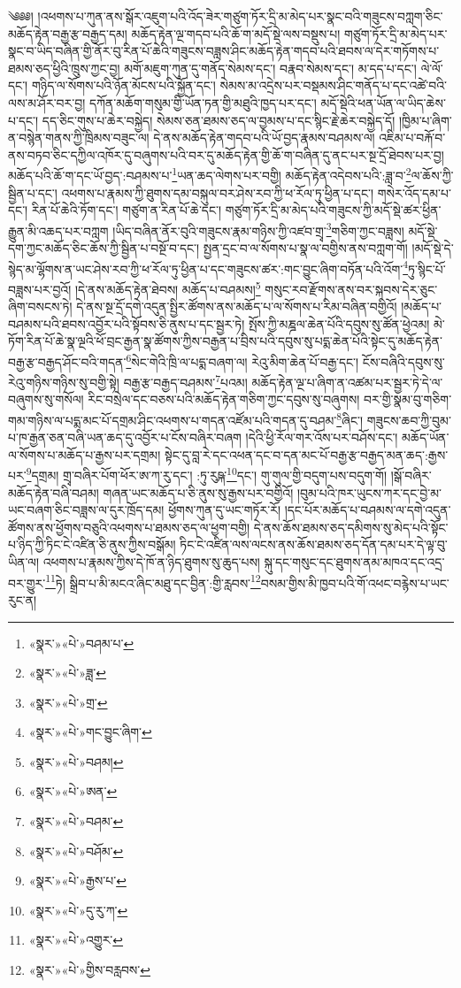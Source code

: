 ༄༅༅། །འཕགས་པ་ཀུན་ནས་སྒོར་འཇུག་པའི་འོད་ཟེར་གཙུག་ཏོར་དྲི་མ་མེད་པར་སྣང་བའི་གཟུངས་བཀླག་ཅིང་མཆོད་རྟེན་བརྒྱ་རྩ་བརྒྱད་དམ། མཆོད་རྟེན་ལྔ་གདབ་པའི་ཆོ་ག་མདོ་སྡེ་ལས་བསྡུས་པ། གཙུག་ཏོར་དྲི་མ་མེད་པར་སྣང་བ་ཡིད་བཞིན་གྱི་ནོར་བུ་རིན་པོ་ཆེའི་གཟུངས་བཟླས་ཤིང་མཆོད་རྟེན་གདབ་པའི་ཐབས་ལ་དེར་གཏོགས་པ་ཐམས་ཅད་ཕྱིའི་ཁྲུས་ཀྱང་བྱ། མགོ་མཇུག་ཀུན་དུ་གནོད་སེམས་དང་། བརྣབ་སེམས་དང་། མ་དད་པ་དང་། ལེ་ལོ་དང་། གཉིད་ལ་སོགས་པའི་ཉོན་མོངས་པའི་སྐྱོན་དང་། སེམས་མ་འདྲེས་པར་བསྡམས་ཤིང་གནོད་པ་དང་འཚེ་བའི་ལས་མ་ཤོར་བར་བྱ། དཀོན་མཆོག་གསུམ་གྱི་ཡོན་ཏན་གྱི་མཐུའི་ཁྱད་པར་དང་། མདོ་སྡེའི་ཕན་ཡོན་ལ་ཡིད་ཆེས་པ་དང་། དད་ཅིང་གུས་པ་ཆེར་བསྐྱེད། སེམས་ཅན་ཐམས་ཅད་ལ་བྱམས་པ་དང་སྙིང་རྗེ་ཆེར་བསྐྱེད་དོ། །ཁྱིམ་པ་ཞིག་ན་བསྙེན་གནས་ཀྱི་ཁྲིམས་བཟུང་ལ། དེ་ནས་མཆོད་རྟེན་གདབ་པའི་ཡོ་བྱད་རྣམས་བཤམས་ལ། འཇིམ་པ་བརྐོ་བ་ནས་བཏབ་ཅིང་དཀྱིལ་འཁོར་དུ་བཞུགས་པའི་བར་དུ་མཆོད་རྟེན་གྱི་ཆོ་ག་བཞིན་དུ་ནང་པར་སྔ་དྲོ་ཐེབས་པར་བྱ། མཆོད་པའི་ཆོ་ག་དང་ཡོ་བྱད་:བཤམས་པ་\footnote{«སྣར་»«པེ་»བཤམ་པ་}ཡན་ཆད་ལེགས་པར་བགྱི། མཆོད་རྟེན་འདེབས་པའི་:ཟླ་བ་\footnote{«སྣར་»«པེ་»ཟླ་}ལ་ཆོས་ཀྱི་སྦྱིན་པ་དང་། འཕགས་པ་རྣམས་ཀྱི་ཐུགས་དམ་བསྐུལ་བར་ཤེས་རབ་ཀྱི་ཕ་རོལ་ཏུ་ཕྱིན་པ་དང་། གསེར་འོད་དམ་པ་དང་། རིན་པོ་ཆེའི་ཏོག་དང་། གཙུག་ན་རིན་པོ་ཆེ་དང་། གཙུག་ཏོར་དྲི་མ་མེད་པའི་གཟུངས་ཀྱི་མདོ་སྡེ་ཚར་ཕྱིན་རྒྱུན་མི་འཆད་པར་བཀླག །ཡིད་བཞིན་ནོར་བུའི་གཟུངས་རྣམ་གཉིས་ཀྱི་འཛབ་གྲྭ་\footnote{«སྣར་»«པེ་»གྲ་}གཅིག་ཀྱང་བཟླས། མདོ་སྡེ་དག་ཀྱང་མཆོད་ཅིང་ཆོས་ཀྱི་སྦྱིན་པ་བསྔོ་བ་དང་། སྤྱན་དྲང་བ་ལ་སོགས་པ་སྣ་ལ་བགྱིས་ནས་བཀླག་གོ། །མདོ་སྡེ་དེ་སྙེད་མ་ལྷོགས་ན་ཡང་ཤེས་རབ་ཀྱི་ཕ་རོལ་ཏུ་ཕྱིན་པ་དང་གཟུངས་ཚར་:གང་བྱུང་ཞིག་བཏོན་པའི་འོག་\footnote{«སྣར་»«པེ་»གང་བྱུང་ཞིག་}ཏུ་སྙིང་པོ་བཟླས་པར་བྱའོ། །དེ་ནས་མཆོད་རྟེན་ཐེབས། མཆོད་པ་བཤམས།\footnote{«སྣར་»«པེ་»བཤམ།} གསུང་རབ་རྫོགས་ནས་བར་སྐབས་དེར་ཅུང་ཞིག་བསངས་ཏེ། དེ་ནས་སྔ་དྲོ་དགེ་འདུན་སྤྱིར་ཚོགས་ནས་མཆོད་པ་ལ་སོགས་པ་རིམ་བཞིན་བགྱིའོ། །མཆོད་པ་བཤམས་པའི་ཐབས་འབྱོར་པའི་སྟོབས་ཅི་ནུས་པ་དང་སྦྱར་ཏེ། སྤོས་ཀྱི་མཎྜལ་ཆེན་པོའི་དབུས་སུ་ཚོན་ཕྱེའམ། མེ་ཏོག་རིན་པོ་ཆེ་སྣ་ལྔའི་ཕོ་བྲང་རྒྱན་སྣ་ཚོགས་ཀྱིས་བརྒྱན་པ་བྲིས་པའི་དབུས་སུ་པདྨ་ཆེན་པོའི་སྟེང་དུ་མཆོད་རྟེན་བརྒྱ་རྩ་བརྒྱད་ཤོང་བའི་གདན་\footnote{«སྣར་»«པེ་»ཨན་}སེང་གེའི་ཁྲི་ལ་པདྨ་བཞག་ལ། རེའུ་མིག་ཆེན་པོ་བརྒྱ་དང་། ངོས་བཞིའི་དབུས་སུ་རེའུ་གཉིས་གཉིས་སུ་བགྱི་སྟེ། བརྒྱ་རྩ་བརྒྱད་བཤམས་\footnote{«སྣར་»«པེ་»བཤམ་}པའམ། མཆོད་རྟེན་ལྔ་པ་ཞིག་ན་འཚམ་པར་སྦྱར་ཏེ་དེ་ལ་བཞུགས་སུ་གསོལ། རིང་བསྲེལ་དང་བཅས་པའི་མཆོད་རྟེན་གཅིག་ཀྱང་དབུས་སུ་བཞུགས། བར་གྱི་སྣམ་བུ་གཅིག་གམ་གཉིས་ལ་པདྨ་མང་པོ་དགྲམ་ཤིང་འཕགས་པ་གདན་འཛོམ་པའི་གདན་དུ་བཤམ་\footnote{«སྣར་»«པེ་»བཤོམ་}ཞིང་། གཟུངས་ཆབ་ཀྱི་བུམ་པ་ཁ་རྒྱན་ཅན་བཞི་ཡན་ཆད་དུ་འབྱོར་པ་ངོས་བཞིར་བཞག །དེའི་ཕྱི་རོལ་གར་འོས་པར་བཤོས་དང་། མཆོད་ཡོན་ལ་སོགས་པ་མཆོད་པ་རྒྱས་པར་དགྲམ། སྟེང་དུ་བླ་རེ་དང་འཕན་དང་བ་དན་མང་པོ་བརྒྱ་རྩ་བརྒྱད་མན་ཆད་:རྒྱས་པར་\footnote{«སྣར་»«པེ་»རྒྱས་པ་}དགྲམ། གྲྭ་བཞིར་པོག་ཕོར་ཨ་ཀ་རུ་དང་། :ཏུ་རུཥྐ་\footnote{«སྣར་»«པེ་»དུ་རུ་ཀ་}དང་། གུ་གུལ་གྱི་བདུག་པས་བདུག་གོ། །སྒོ་བཞིར་མཆོད་རྟེན་བཞི་བཤམ། གཞན་ཡང་མཆོད་པ་ཅི་ནུས་སུ་རྒྱས་པར་བགྱིའོ། །བུམ་པའི་ཁར་ཡུངས་ཀར་དང་བྱེ་མ་ཡང་བཞག་ཅིང་བཟླས་ལ་དུར་ཁྲོད་དམ། ཕྱོགས་ཀུན་དུ་ཡང་གཏོར་རོ། །དང་པོར་མཆོད་པ་བཤམས་ལ་དགེ་འདུན་ཚོགས་ནས་ཕྱོགས་བཅུའི་འཕགས་པ་ཐམས་ཅད་ལ་ཕྱག་བགྱི། དེ་ནས་ཆོས་ཐམས་ཅད་དམིགས་སུ་མེད་པའི་སྟོང་པ་ཉིད་ཀྱི་ཏིང་ངེ་འཛིན་ཅི་ནུས་ཀྱིས་བསྒོམ། ཏིང་ངེ་འཛིན་ལས་ལངས་ནས་ཆོས་ཐམས་ཅད་དོན་དམ་པར་དེ་ལྟ་བུ་ཡིན་ལ། འཕགས་པ་རྣམས་ཀྱིས་དེ་ཁོ་ན་ཉིད་ཐུགས་སུ་ཆུད་པས། སྐུ་དང་གསུང་དང་ཐུགས་ནམ་མཁའ་དང་འདྲ་བར་གྱུར་\footnote{«སྣར་»«པེ་»འགྱུར་}ཏེ། སྒྲིབ་པ་མི་མངའ་ཞིང་མཐུ་དང་བྱིན་:གྱི་རླབས་\footnote{«སྣར་»«པེ་»གྱིས་བརླབས་}བསམ་གྱིས་མི་ཁྱབ་པའི་གོ་འཕང་བརྙེས་པ་ཡང་རུང་ན། 